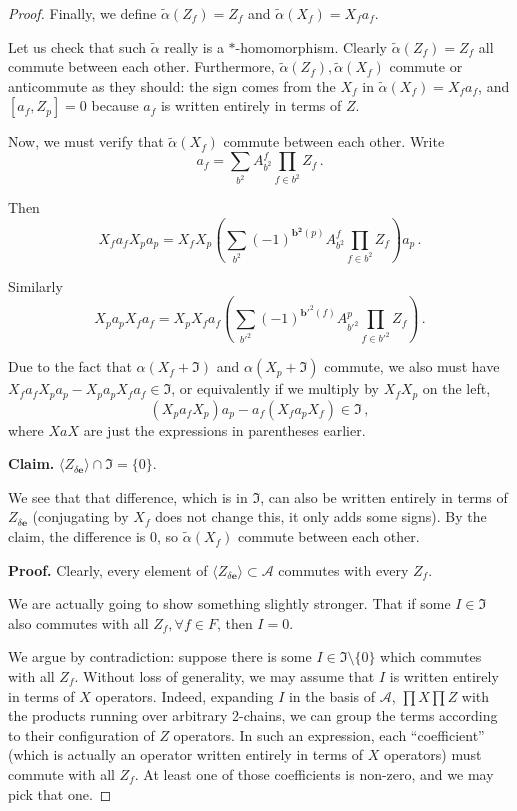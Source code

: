 \documentclass[10pt,a4paper]{amsart}
\newcommand{\be}{\begin{equation}}
\newcommand{\ee}{\end{equation}}
\newcommand{\mc}[1]{\mathcal{#1}}
\newcommand{\paren}[1]{\left( #1 \right)}
\begin{document}
\begin{proof}
 Finally, we define $\tilde{\alpha}(Z_f) = Z_f$ and $\tilde{\alpha}(X_f) = X_f a_f$.

 Let us check that such $\tilde{\alpha}$ really is a $*$-homomorphism. Clearly $\tilde{\alpha}(Z_f) = Z_f$ all commute between each other. Furthermore, $\tilde{\alpha}(Z_f), \tilde{\alpha}(X_f)$ commute or anticommute as they should: the sign comes from the $X_f$ in $\tilde{\alpha}(X_f) = X_f a_f$, and $[a_f, Z_p] = 0$ because $a_f$ is written entirely in terms of $Z$.

 Now, we must verify that $\tilde{\alpha}(X_f)$ commute between each other. Write
 \be
 a_f = \sum_{b^2} A^f_{b^2} \prod_{f \in b^2} Z_f \,.
 \ee

 Then
 \be
 X_f a_f X_p a_p = X_f X_p \paren{\sum_{b^2} (-1)^{\bm{b^2}(p)} A^f_{b^2} \prod_{f \in b^2} Z_f } a_p \,.
 \ee

 Similarly
 \be
 X_p a_p X_f a_f = X_p X_f a_f \paren{ \sum_{b'^2} (-1)^{\bm{b}'^2(f)} A^p_{b'^2} \prod_{f \in b'^2} Z_f } \,.
 \ee

 Due to the fact that $\alpha(X_f + \mathfrak{I})$ and $\alpha(X_p + \mathfrak{I})$ commute, we also must have $X_f a_f X_p a_p - X_p a_p X_f a_f \in \mathfrak{I}$, or equivalently if we multiply by $X_f X_p$ on the left,
 \be
 (X_p a_f X_p) a_p - a_f (X_f a_p X_f) \in \mathfrak{I} \,,
 \ee
 where $X a X$ are just the expressions in parentheses earlier.
 
 \textbf{Claim.} $\langle Z_{\delta \bm{e}} \rangle \cap \mathfrak{I} = \{ 0 \}$.

 We see that that difference, which is in $\mathfrak{I}$, can also be written entirely in terms of $Z_{\delta \bm{e}}$ (conjugating by $X_f$ does not change this, it only adds some signs). By the claim, the difference is $0$, so $\tilde{\alpha}(X_f)$ commute between each other.

 \textbf{Proof.} Clearly, every element of $\langle Z_{\delta \bm{e}} \rangle \subset \mc{A}$ commutes with every $Z_f$.

 We are actually going to show something slightly stronger. That if some $I \in \mathfrak{I}$ also commutes with all $Z_f, \forall f \in F$, then $I = 0$.

 We argue by contradiction: suppose there is some $I \in \mathfrak{I} \setminus \{0\}$ which commutes with all $Z_f$. Without loss of generality, we may assume that $I$ is written entirely in terms of $X$ operators. Indeed, expanding $I$ in the basis of $\mc{A}$, $\prod X \prod Z$ with the products running over arbitrary 2-chains, we can group the terms according to their configuration of $Z$ operators. In such an expression, each ``coefficient'' (which is actually an operator written entirely in terms of $X$ operators) must commute with all $Z_f$. At least one of those coefficients is non-zero, and we may pick that one.


\end{proof}
\end{document}
